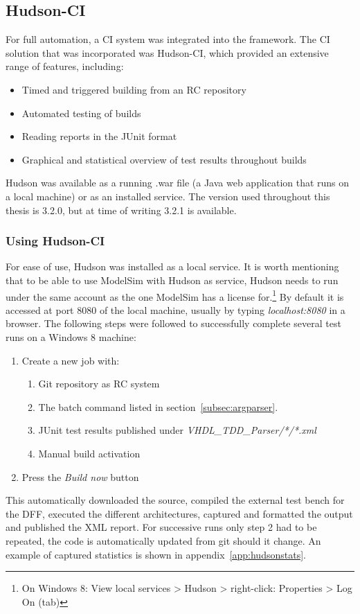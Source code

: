 \documentclass[11pt,british]{article}
\begin{document}
\subsection{Hudson-CI}
\label{subsec:Hudson}
For full automation, a \gls{CI} system was integrated into the framework. The \gls{CI} solution that was incorporated was Hudson-CI, which provided an extensive range of features, including:
\begin{itemize}%
\item Timed and triggered building from an \gls{RC} repository
\item Automated testing of builds
\item Reading reports in the JUnit format
\item Graphical and statistical overview of test results throughout builds
\end{itemize}
Hudson was available as a running .war file (a Java web application that runs on a local machine) or as an installed service.\cite{hudson} The version used throughout this thesis is 3.2.0, but at time of writing 3.2.1 is available.

\subsubsection{Using Hudson-CI}
\label{subsec:usinghud}
For ease of use, Hudson was installed as a local service. It is worth mentioning that to be able to use ModelSim with Hudson as service, Hudson needs to run under the same account as the one ModelSim has a license for.\footnote{On Windows 8: View local services > Hudson > right-click: Properties > Log On (tab)} By default it is accessed at port 8080 of the local machine, usually by typing \emph{localhost:8080} in a browser. The following steps were followed to successfully complete several test runs on a Windows 8 machine:
\begin{enumerate}
\item Create a new job with:
\begin{enumerate}
\item Git repository as RC system
\item The batch command listed in section~\ref{subsec:argparser}.
\item JUnit test results published under \emph{VHDL\_TDD\_Parser/*/*.xml}
\item Manual build activation
\end{enumerate}
\item Press the \emph{Build now} button
\end{enumerate}
This automatically downloaded the source, compiled the external test bench for the \gls{DFF}, executed the different architectures, captured and formatted the output and published the \gls{XML} report. For successive runs only step 2 had to be repeated, the code is automatically updated from git should it change. An example of captured statistics is shown in appendix~\ref{app:hudsonstats}.
\end{document}
